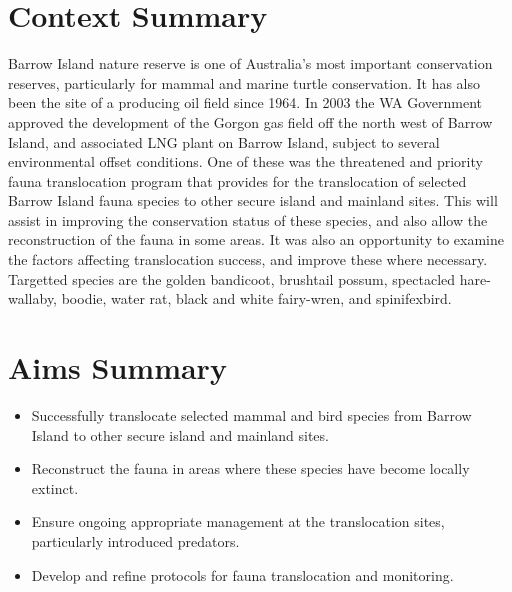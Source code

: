 \documentclass[version=last, paper=a4, DIV=18, usenames, dvipsnames]{scrartcl}
\begin{document}
%

%




\section*{Context Summary}
Barrow Island nature reserve is one of Australia's most important
conservation reserves, particularly for mammal and marine turtle
conservation. It has also been the site of a producing oil field since
1964. In 2003 the WA Government approved the development of the Gorgon
gas field off the north west of Barrow Island, and associated LNG plant
on Barrow Island, subject to several environmental offset conditions.
One of these was the threatened and priority fauna translocation program
that provides for the translocation of selected Barrow Island fauna
species to other secure island and mainland sites. This will assist in
improving the conservation status of these species, and also allow the
reconstruction of the fauna in some areas. It was also an opportunity to
examine the factors affecting translocation success, and improve these
where necessary. Targetted species are the golden bandicoot, brushtail
possum, spectacled hare-wallaby, boodie, water rat, black and white
fairy-wren, and spinifexbird.



\section*{Aims Summary}
\begin{itemize}
\itemsep1pt\parskip0pt
\item
  Successfully translocate selected mammal and bird species from Barrow
  Island to other secure island and mainland sites.
\item
  Reconstruct the fauna in areas where these species have become locally
  extinct.
\item
  Ensure ongoing appropriate management at the translocation sites,
  particularly introduced predators.
\item
  Develop and refine protocols for fauna translocation and monitoring.
\end{itemize}
\end{document}
